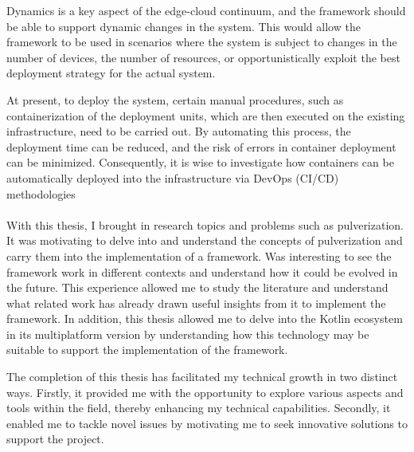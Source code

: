 Dynamics is a key aspect of the edge-cloud continuum, and the framework should be able to support dynamic changes in the system. This would allow
the framework to be used in scenarios where the system is subject to changes in the number of devices, the number of resources, or opportunistically
exploit the best deployment strategy for the actual system.

At present, to deploy the system, certain manual procedures, such as containerization of the deployment units, which are then executed on 
the existing infrastructure, need to be carried out. By automating this process, the deployment time can be reduced, and the risk of errors in 
container deployment can be minimized. Consequently, it is wise to investigate how containers can be automatically deployed into the 
infrastructure via DevOps (CI/CD) methodologies

\paragraph*{}

With this thesis, I brought in research topics and problems such as pulverization. It was motivating to delve into and understand the
concepts of pulverization and carry them into the implementation of a framework. Was interesting to see the framework work in different
contexts and understand how it could be evolved in the future. This experience allowed me to study the literature and understand what
related work has already drawn useful insights from it to implement the framework.
In addition, this thesis allowed me to delve into the Kotlin ecosystem in its multiplatform version by understanding how this technology may be
suitable to support the implementation of the framework.

The completion of this thesis has facilitated my technical growth in two distinct ways. Firstly, it provided me with the opportunity to explore 
various aspects and tools within the field, thereby enhancing my technical capabilities. Secondly, it enabled me to tackle novel issues by motivating 
me to seek innovative solutions to support the project.